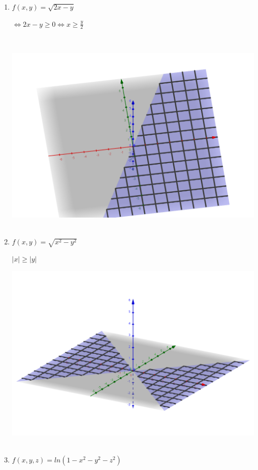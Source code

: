\documentclass[../practica_02.tex]{subfiles}
\begin{document}
    \begin{enumerate}
        \item $f(x,y) = \sqrt{2x - y}$

            $ \Leftrightarrow 2x - y \geq 0 \Leftrightarrow x \geq \frac{y}{2}$

            $ $

            \includegraphics[scale=0.4]{ej13/resources/a.png} $ $
            
        \item $ f(x,y) = \sqrt{x^2 - y^2}$
            
            $ |x| \geq |y| $

            \includegraphics[scale=0.4]{ej13/resources/b.png} $ $

        \item $ f(x,y,z) = ln(1-x^2-y^2-z^2)$


\end{enumerate}
\end{document}
